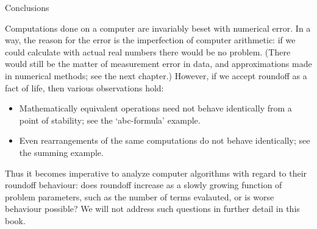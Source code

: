 
 {Conclusions}

Computations done on a computer are invariably beset with numerical error.
In a way, the reason for the error is the imperfection of computer
arithmetic: if we could calculate with actual real numbers there would
be no problem. (There would still be the matter of measurement error
in data, and approximations made in numerical methods; see the next
chapter.) However, if we accept roundoff as a fact of life, then
various observations hold:
\begin{itemize}
\item Mathematically equivalent operations need not behave identically
  from a point of stability; see the `abc-formula' example.
\item Even rearrangements of the same computations do not behave
  identically; see the summing example.
\end{itemize}
Thus it
becomes imperative to analyze computer algorithms with regard to their
roundoff behaviour: does roundoff increase as a slowly growing
function of problem parameters, such as the number of terms evalauted,
or is worse behaviour possible? We will not address such questions in
further detail in this book.


